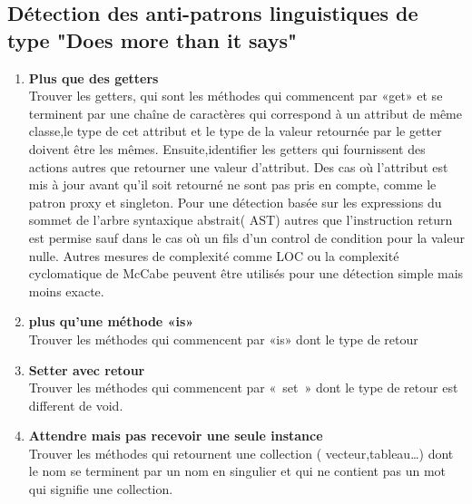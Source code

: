 \subsection{Détection des anti-patrons linguistiques de type "Does more than it says"}
\begin{enumerate}
    

\item \textbf{Plus que des getters}\\
Trouver les getters, qui sont les méthodes qui commencent par «get» et se terminent par une chaîne de caractères qui correspond à un attribut de même classe,le type de cet attribut et le type de la valeur retournée par le getter doivent être les mêmes. Ensuite,identifier les getters qui fournissent des actions autres que retourner une valeur d’attribut. Des cas où l’attribut est mis à jour avant qu’il soit retourné ne sont pas pris en compte, comme le patron proxy et singleton.
Pour une détection basée sur les expressions du sommet de l’arbre syntaxique abstrait( AST)  autres que l’instruction return est permise sauf dans le cas où un fils d’un control de condition pour la valeur nulle. Autres mesures de complexité comme LOC  ou la complexité cyclomatique de McCabe peuvent être utilisés pour une détection simple mais moins exacte.
\item \textbf{plus qu’une méthode «is»}\\
Trouver les méthodes qui commencent par «is» dont le type de retour 
\item \textbf{Setter avec retour}\\
Trouver les méthodes qui commencent par « set » dont le type de retour est different de void.
\item \textbf{Attendre mais pas recevoir une seule instance}\\
Trouver les méthodes qui retournent une collection ( vecteur,tableau…) dont le nom se terminent par un nom en singulier et qui ne contient pas un mot qui signifie une collection.
\end{enumerate}
